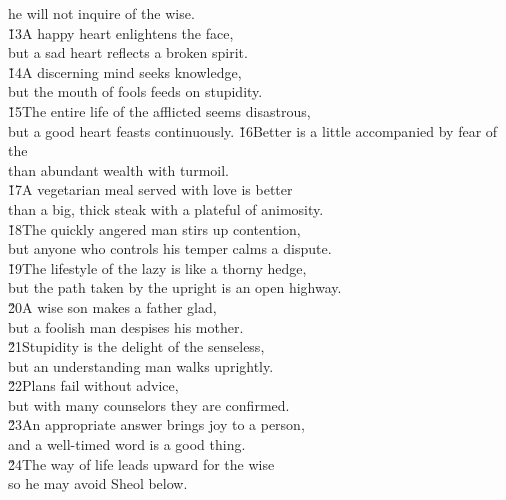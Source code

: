 \begin{poetry}
\poemll    he will not inquire of the wise. \\
\poeml \v{13}A happy heart enlightens the face, \\
\poemll    but a sad heart reflects a broken spirit. \\
\poeml \v{14}A discerning mind seeks knowledge, \\
\poemll    but the mouth of fools feeds on stupidity. \\
\poeml \v{15}The entire life of the afflicted seems disastrous, \\
\poemll    but a good heart feasts continuously.
\poeml \v{16}Better is a little accompanied by fear of the  \\
\poemll    than abundant wealth with turmoil. \\
\poeml \v{17}A vegetarian meal served with love is better \\
\poemll    than a big, thick steak with a plateful of animosity. \\
\poeml \v{18}The quickly angered man stirs up contention, \\
\poemll    but anyone who controls his temper calms a dispute. \\
\poeml \v{19}The lifestyle of the lazy is like a thorny hedge, \\
\poemll    but the path taken by the upright is an open highway. \\
\poeml \v{20}A wise son makes a father glad, \\
\poemll    but a foolish man despises his mother. \\
\poeml \v{21}Stupidity is the delight of the senseless, \\
\poemll    but an understanding man walks uprightly. \\
\poeml \v{22}Plans fail without advice, \\
\poemll    but with many counselors they are confirmed. \\
\poeml \v{23}An appropriate answer brings joy to a person, \\
\poemll    and a well-timed word is a good thing. \\
\poeml \v{24}The way of life leads upward for the wise \\
\poemll    so he may avoid Sheol below. \\

\end{poetry}
